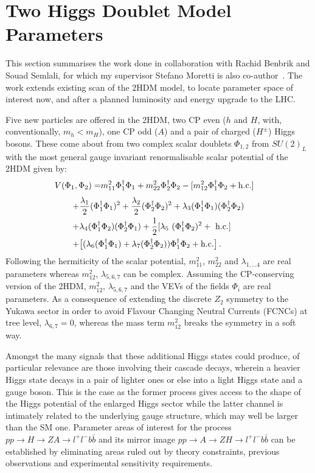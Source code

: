\section{Two Higgs Doublet Model Parameters}\label{sec:2HDM}

This section summarises the work done in collaboration with Rachid Benbrik and Souad Semlali, 
for which my supervisor Stefano Moretti is also co-author~\cite{benbrik2020mapping}.
The work extends existing scan of the 2HDM model,
to locate parameter space of interest now, and after
a planned luminosity and energy upgrade to the LHC.

Five new particles are offered in the 2HDM,
two CP even (\(h\) and \(H\), with, conventionally, \(m_h < m_H\)),
one CP odd (\(A\))
and a pair of charged (\(H^\pm\)) Higgs bosons.
These come about from two complex scalar doublets \(\Phi_{1,2}\) from \(SU(2)_L\) with 
the most general gauge invariant renormalisable scalar potential of the 2HDM  given by:
\begin{align}\nonumber
V(\Phi_1,\Phi_2) =& m_{11}^2\Phi_1^\dagger\Phi_1+m_{22}^2\Phi_2^\dagger\Phi_2-[m_{12}^2\Phi_1^\dagger\Phi_2+{\rm h.c.}] \nonumber
\end{align}
\begin{align}
+& \frac{\lambda_1}{2}(\Phi_1^\dagger\Phi_1)^2
+\frac{\lambda_2}{2}(\Phi_2^\dagger\Phi_2)^2
+\lambda_3(\Phi_1^\dagger\Phi_1)(\Phi_2^\dagger\Phi_2)\nonumber\\
+&\lambda_4(\Phi_1^\dagger\Phi_2)(\Phi_2^\dagger\Phi_1) 
+\frac{1}{2}[\lambda_5~(\Phi_1^\dagger\Phi_2)^2 +~{\rm h.c.}]\nonumber\\
+&\big[ (\lambda_6(\Phi_1^\dagger\Phi_1)
+\lambda_7(\Phi_2^\dagger\Phi_2))
\Phi_1^\dagger\Phi_2+{\rm h.c.}\big] \,. \label{pot1}
\end{align}
Following the hermiticity of the scalar potential, \(m_{11}^2\), \(m_{22}^2\) and \(\lambda_{1,\ldots4}\) are real parameters
whereas \(m_{12}^2\), \(\lambda_{5,6,7}\) can be complex.
Assuming the CP-conserving version of the 2HDM, \(m_{12}^2\), \(\lambda_{5,6,7}\) and the VEVs of the fields \(\Phi_i\) are real parameters.
As a consequence of extending the discrete \(Z_2\) symmetry to the Yukawa sector in order to avoid Flavour Changing Neutral Currents (FCNCs) at tree level,
\(\lambda_{6,7}=0\), whereas the mass term \(m_{12}^2\) breaks the symmetry in a soft way.

Amongst the many signals that these additional Higgs states could produce,
of particular relevance are those involving their cascade decays,
wherein a heavier Higgs state decays in a pair of lighter ones or else into a light Higgs state and a gauge boson.
This is the case as the former process gives access to the shape of the Higgs potential of the enlarged Higgs sector
while the latter channel is intimately related to the underlying gauge structure, which may well be larger than the SM one. 
Parameter areas of interest for the process \(pp\to H\to ZA\to l^+l^-b\bar b\)
and its mirror image \(pp\to A \to ZH\to l^+l^-b\bar{b}\) 
can be established by eliminating areas ruled out by theory constraints,
previous observations and experimental sensitivity requirements.


